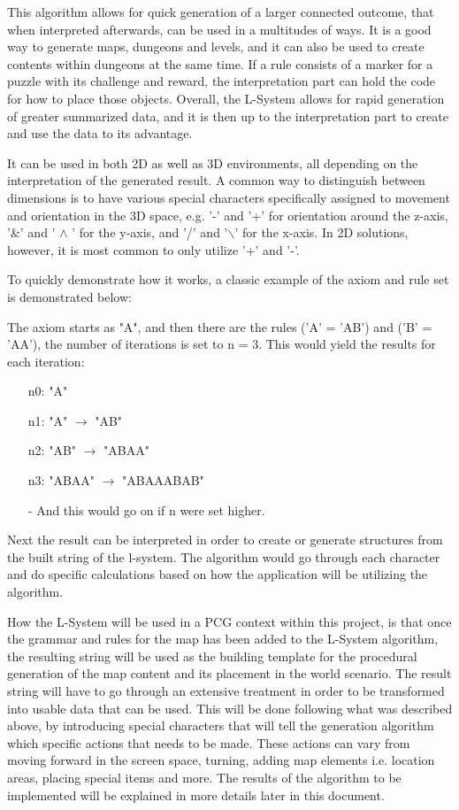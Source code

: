 This algorithm allows for quick generation of a larger connected outcome, that when interpreted afterwards, can be used in a multitudes of ways. 
It is a good way to generate maps, dungeons and levels, and it can also be used to create contents within dungeons at the same time. If a rule consists of a marker for a puzzle with its challenge and reward, the interpretation part can hold the code for how to place those objects. 
Overall, the L-System allows for rapid generation of greater summarized data, and it is then up to the interpretation part to create and use the data to its advantage.

It can be used in both 2D as well as 3D environments, all depending on the interpretation of the generated result. A common way to distinguish between dimensions is to have various special characters specifically assigned to movement and orientation in the 3D space, e.g. '-' and '+' for orientation around the z-axis, '$\&$' and ' $\wedge$ ' for the y-axis, and '/' and '$\backslash$' for the x-axis. In 2D solutions, however, it is most common to only utilize '+' and '-'. 

To quickly demonstrate how it works, a classic example of the axiom and rule set is demonstrated below:

The axiom starts as "A", and then there are the rules ('A' = 'AB') and ('B' = 'AA'), the number of iterations is set to n = 3. This would yield the results for each iteration:
\begin{itemize}
\item[n0:] "A"
\item[n1:] "A" $\rightarrow$  "AB"
\item[n2:] "AB"  $\rightarrow$ "ABAA"
\item[n3:] "ABAA"  $\rightarrow$  "ABAAABAB"
\item[-] And this would go on if n were set higher.
\end{itemize}

Next the result can be interpreted in order to create or generate structures from the built string of the l-system. The algorithm would go through each character and do specific calculations based on how the application will be utilizing the algorithm.

How the L-System will be used in a PCG context within this project, is that once the grammar and rules for the map has been added to the L-System algorithm, the resulting string will be used as the building template for the procedural generation of the map content and its placement in the world scenario. The result string will have to go through an extensive treatment in order to be transformed into usable data that can be used. This will be done following what was described above, by introducing special characters that will tell the generation algorithm which specific actions that needs to be made. These actions can vary from moving forward in the screen space, turning, adding map elements i.e. location areas, placing special items and more. The results of the algorithm to be implemented will be explained in more details later in this document.

